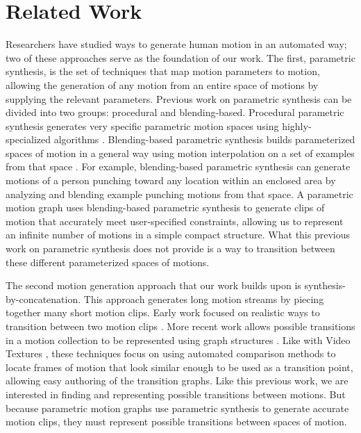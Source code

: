 \documentclass[10pt,twocolumn]{article}
\begin{document}
\section{Related Work}
\label{sec:related-work}

Researchers have studied ways to generate human motion in an automated way; two of these approaches serve as the foundation of our work. The first, parametric synthesis, is the set of techniques that map motion parameters to motion, allowing the generation of any motion from an entire space of motions by supplying the relevant parameters. Previous work on parametric synthesis can be divided into two groups: procedural and blending-based. Procedural parametric synthesis generates very specific parametric motion spaces using highly-specialized algorithms \citep{perlin1995,perlin1996,hodgins1995}. Blending-based parametric synthesis builds parameterized spaces of motion in a general way using motion interpolation \citep{bruderlin1995} on a set of examples from that space \citep{wiley1997,rose1998,kovar2004,mukai2005}. For example, blending-based parametric synthesis can generate motions of a person punching toward any location within an enclosed area by analyzing and blending example punching motions from that space. A parametric motion graph uses blending-based parametric synthesis to generate clips of motion that accurately meet user-specified constraints, allowing us to represent an infinite number of motions in a simple compact structure. What this previous work on parametric synthesis does not provide is a way to transition between these different parameterized spaces of motions.

The second motion generation approach that our work builds upon is synthesis-by-concatenation. This approach generates long motion streams by piecing together many short motion clips. Early work focused on realistic ways to transition between two motion clips \citep{rose1996,lamouret1996}. More recent work allows possible transitions in a motion collection to be represented using graph structures \citep{arikan2002,kovar2002,lee2002,arikan2003,kim2003}. Like with Video Textures \citep{schodl2000}, these techniques focus on using automated comparison methods to locate frames of motion that look similar enough to be used as a transition point, allowing easy authoring of the transition graphs. Like this previous work, we are interested in finding and representing possible transitions between motions. But because parametric motion graphs use parametric synthesis to generate accurate motion clips, they must represent possible transitions between spaces of motion.
\end{document}

